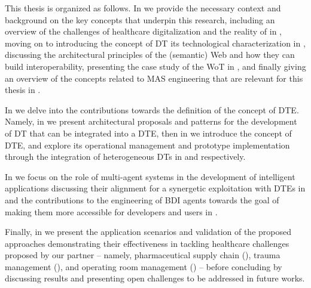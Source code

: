 This thesis is organized as follows. 
In  we provide the necessary context and background on the key concepts that underpin this research, including an overview of the challenges of healthcare digitalization and the reality of \ausl{} in ,
moving on to introducing the concept of \ac{DT} its technological characterization  in ,
discussing the architectural principles of the (semantic) Web and how they can build interoperability, presenting the case study of the \ac{WoT} in ,
and finally giving an overview of the concepts related to \ac{MAS} engineering that are relevant for this thesis in .

In  we delve into the contributions towards the definition of the concept of \ac{DTE}. Namely, in  we present architectural proposals and patterns for the development of \ac{DT} that can be integrated into a \ac{DTE}, then in  we introduce the concept of \ac{DTE}, and explore its operational management and prototype implementation through the integration of heterogeneous \acp{DT} in  and  respectively.

In  we focus on the role of multi-agent systems in the development of intelligent applications discussing their alignment for a synergetic exploitation with \acp{DTE} in  and the contributions to the engineering of \ac{BDI} agents towards the goal of making them more accessible for developers and users in .

Finally, in  we present the application scenarios and validation of the proposed approaches demonstrating their effectiveness in tackling healthcare challenges proposed by our partner \ausl{}
-- namely, pharmaceutical supply chain (), trauma management (), and operating room management () --
before concluding by discussing results and presenting open challenges to be addressed in future works.